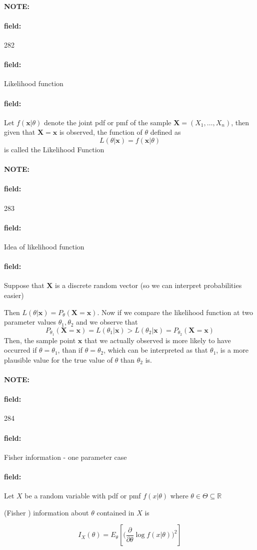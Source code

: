 \documentclass[12pt]{article}
\newenvironment{note}{\paragraph{NOTE:}}{}
\newenvironment{field}{\paragraph{field:}}{}
\begin{document}
\begin{note} \begin{field} \tiny 282 \end{field}
  \begin{field}
    Likelihood function
  \end{field}
  \begin{field}
    Let $f(\mathbf{x}|\theta)$ denote the joint pdf or pmf of the sample $\mathbf{X} = (X_1, \ldots , X_n)$, then given that $\mathbf{X} = \mathbf{x}$ is observed, the function of $\theta$ defined as $$L(\theta|\mathbf{x}) = f(\mathbf{x}|\theta)$$
    is called the Likelihood Function
  \end{field}
\end{note}

\begin{note} \begin{field} \tiny 283 \end{field}
  \begin{field}
    Idea of likelihood function
  \end{field}
  \begin{field}
    Suppose that $\mathbf{X}$ is a discrete random vector (so we can interpret probabilities easier)

    Then $L(\theta|\mathbf{x}) = P_\theta(\mathbf{X} = \mathbf{x})$. Now if we compare the likelihood function at two parameter values $\theta_1, \theta_2$ and we observe that $$P_{\theta_1}(\mathbf{X} = \mathbf{x}) = L(\theta_1|\mathbf{x}) > L(\theta_2|\mathbf{x}) = P_{\theta_2}(\mathbf{X} = \mathbf{x})$$
    Then, the sample point $\mathbf{x}$ that we actually observed is more likely to have occurred if $\theta = \theta_1$, than if $\theta= \theta_2$, which can be interpreted as that $\theta_1$, is a more plausible value for the true value of $\theta$ than $\theta_2$ is.
  \end{field}
\end{note}


\begin{note} \begin{field} \tiny 284 \end{field}
  \begin{field}
    Fisher information - one parameter case
  \end{field}
  \begin{field}
    Let $X$ be a random variable with pdf or pmf $f(x |\theta)$ where $\theta \in \Theta \subseteq \mathbb{R}$

    (Fisher ) information about $\theta$ contained in $X$ is

    $$ I_{X}(\theta) = E_\theta[ \big(\frac{\partial}{\partial \theta} \log f(x|\theta)\big)^2]$$
  \end{field}
\end{note}
\end{document}
